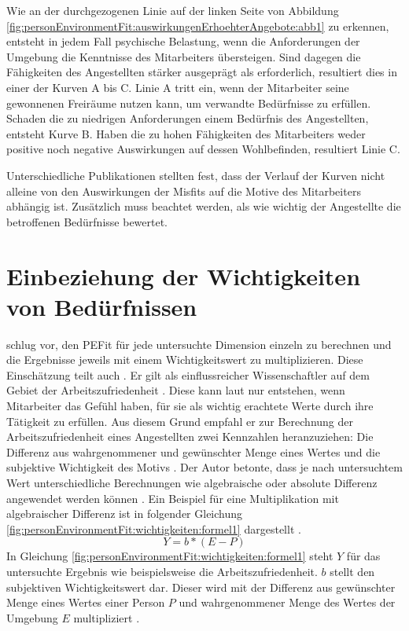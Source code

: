 Wie an der durchgezogenen Linie auf der linken Seite von Abbildung \ref{fig:personEnvironmentFit:auswirkungenErhoehterAngebote:abb1} zu erkennen, entsteht in jedem Fall psychische Belastung, wenn die Anforderungen der Umgebung die Kenntnisse des Mitarbeiters übersteigen. Sind dagegen die Fähigkeiten des Angestellten stärker ausgeprägt als erforderlich, resultiert dies in einer der Kurven A bis C. Linie A tritt ein, wenn der Mitarbeiter seine gewonnenen Freiräume nutzen kann, um verwandte Bedürfnisse zu erfüllen. Schaden die zu niedrigen Anforderungen einem Bedürfnis des Angestellten, entsteht Kurve B. Haben die zu hohen Fähigkeiten des Mitarbeiters weder positive noch negative Auswirkungen auf dessen Wohlbefinden, resultiert Linie C. \cite[S. 22f.]{edwards:2008}\cite[S. 12f.]{harrison:1978}

Unterschiedliche Publikationen stellten fest, dass der Verlauf der Kurven nicht alleine von den Auswirkungen der Misfits auf die Motive des Mitarbeiters abhängig ist. Zusätzlich muss beachtet werden, als wie wichtig der Angestellte die betroffenen Bedürfnisse bewertet. \cite[S. 9f.]{edwards:1996}

\section{Einbeziehung der Wichtigkeiten von Bedürfnissen}
\label{ch:personEnvironmentFit:wichtigkeiten}
\textcite[S. 16]{harrison:1985} schlug vor, den \ac{PEFit} für jede untersuchte Dimension einzeln zu berechnen und die Ergebnisse jeweils mit einem Wichtigkeitswert zu multiplizieren. Diese Einschätzung teilt auch \textcite[S. 8f.]{locke:1976}. Er gilt als einflussreicher Wissenschaftler auf dem Gebiet der Arbeitszufriedenheit \cite[S. 12]{edwards:2008}. Diese kann laut \textcite[S. 8]{locke:1969} nur entstehen, wenn Mitarbeiter das Gefühl haben, für sie als wichtig erachtete Werte durch ihre Tätigkeit zu erfüllen. Aus diesem Grund empfahl er zur Berechnung der Arbeitszufriedenheit eines Angestellten zwei Kennzahlen heranzuziehen: Die Differenz aus wahrgenommener und gewünschter Menge eines Wertes und die subjektive Wichtigkeit des Motivs \cite[S. 8]{locke:1976}. Der Autor betonte, dass je nach untersuchtem Wert unterschiedliche Berechnungen wie algebraische oder absolute Differenz angewendet werden können \cite[S. 13]{edwards:2008}. Ein Beispiel für eine Multiplikation mit algebraischer Differenz ist in folgender Gleichung \ref{fig:personEnvironmentFit:wichtigkeiten:formel1} dargestellt \cite[S. 13]{edwards:2008}.
\begin{equation}
	Y = b * (E - P)
	\label{fig:personEnvironmentFit:wichtigkeiten:formel1}
\end{equation}
In Gleichung \ref{fig:personEnvironmentFit:wichtigkeiten:formel1} steht $Y$ für das untersuchte Ergebnis wie beispielsweise die Arbeitszufriedenheit. $b$ stellt den subjektiven Wichtigkeitswert dar. Dieser wird mit der Differenz aus gewünschter Menge eines Wertes einer Person $P$ und wahrgenommener Menge des Wertes der Umgebung $E$ multipliziert \cite[S. 13]{edwards:2008}.

